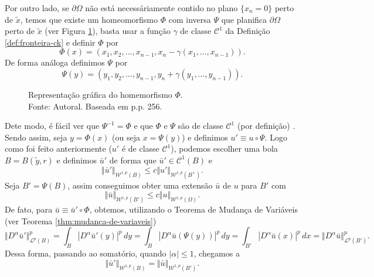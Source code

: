 \documentclass[a4paper, 11pt]{book}
\theoremstyle{definition}
\newcommand{\cC}{\mathcal{C}}
\newcommand{\cL}{\mathcal{L}}
\newcommand{\cW}{\mathcal{W}}
\begin{document}
\begin{prf}
    Por outro lado, se $\partial\Omega$ não está necessáriamente contido no plano $\{x_n = 0\}$ perto de $\tilde x$, temos que existe um homeomorfismo $\Phi$ com inversa $\Psi$ que planifica $\partial \Omega$ perto de $\tilde x$ (ver Figura \ref{fig:homeomorfismo}),  basta usar a função $\gamma$ de classe $\cC^1$ da Definição \ref{def:fronteira-ck} e definir $\Phi$ por
    \begin{equation} \label{eq:Phi}
        \Phi(x) = (x_1,x_2,...,x_{n-1}, x_n - \gamma(x_1,\dots,x_{n-1})).
    \end{equation}
    De forma análoga definimos $\Psi$ por
    \begin{equation} \label{eq:Psi}
        \Psi(y) = (y_1,y_2,\dots,y_{n-1},y_n + \gamma(y_1,\dots,y_{n-1})).
    \end{equation}
    \begin{figure}
        \centering
        
        \caption{Representação gráfica do homemorfismo $\Phi$.\\Fonte: Autoral. Baseada em \cite{evans-pde} p.p. 256.}
        \label{fig:homeomorfismo}
    \end{figure}
    Dete modo, é fácil ver que $\Psi^{-1} = \Phi$ e que $\Phi$ e $\Psi$ são de classe $\cC^1$ (por definição) . Sendo assim, seja $y = \Phi(x)$ (ou seja $x = \Psi(y)$) e definimos $u' \equiv u \circ \Psi$. Logo como foi feito anteriormente ($u'$ é de classe $\cC^1$), podemos escolher uma bola $B = B(\tilde y, r)$ e definimos $\bar u'$ de forma que $\bar u' \in \cC^1(B)$ e
    \begin{equation} \label{eq:BBBB}
        \Vert \bar u' \Vert_{\cW^{1,p}(B)} \leqslant c \Vert u' \Vert_{\cW^{1,p}(B^+)}.
    \end{equation}
    Seja $B' = \Psi(B)$, assim conseguimos obter uma extensão $\bar u$ de $u$ para $B'$ com
    \[
        \Vert \bar u \Vert_{\cW^{1,p}(B')} \leqslant c \Vert u \Vert_{\cW^{1,p}(\Omega)}.
    \]
    De fato, para $\bar u \equiv \bar u' \circ \Phi$, obtemos, utilizando o Teorema de Mudança de Variáveis (ver Teorema \ref{thm:mudanca-de-variaveis})
    \[
        \Vert D^\alpha \bar u' \Vert_{\cL^p(B)}^p = \int_B |D^\alpha \bar u'(y)|^p \,dy = \int_B |D^\alpha \bar u (\Psi (y))|^p \,dy = \int_{B'} |D^\alpha \bar u (x)|^p \,dx = \Vert D^\alpha \bar u \Vert_{\cL^p(B')}^p.
    \]
    Dessa forma, passando ao somatório, quando $|\alpha| \leqslant 1$, chegamos a
    \begin{equation} \label{eq:normaBigualnormaW}
        \Vert \bar u' \Vert_{\cW^{1,p}(B)} = \Vert  \bar u \Vert_{\cW^{1,p}(B')}.

\end{equation}
\end{prf}
\end{document}
